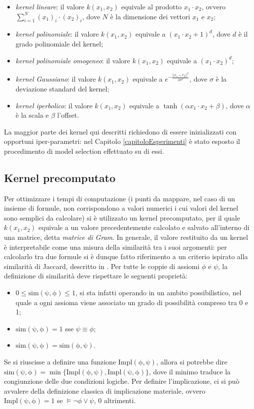 \documentclass[12pt,a4paper]{report}
\begin{document}
\begin{itemize}
\item \emph{kernel lineare}: il valore $k(x_1,x_2)$ equivale al prodotto $x_1\cdot x_2$, ovvero  $\sum_{i=1}^N(x_1)_i\cdot(x_2)_i$, dove $N$ è la dimensione dei vettori $x_1$ e $x_2$;
\item \emph{kernel polinomiale}: il valore $k(x_1,x_2)$ equivale a $(x_1\cdot x_2 + 1)^d$, dove $d$ è il grado polinomiale del kernel;
\item \emph{kernel polinomiale omogeneo}:  il valore  $k(x_1,x_2)$ equivale a $(x_1\cdot x_2)^d$;
\item \emph{kernel Gaussiano}:   il valore  $k(x_1,x_2)$ equivale a $e^{-\frac{||x_1 - x_2||^2}{2 \sigma^2}}$, dove $\sigma$ è la deviazione standard del kernel;
\item \emph{kernel iperbolico}:   il valore $k(x_1,x_2)$  equivale a $\tanh(\alpha x_1 \cdot x_2 + \beta)$, dove $\alpha$ è la scala e $\beta$ l'offset.
\end{itemize}

La maggior parte dei kernel qui descritti richiedono di essere inizializzati con opportuni iper-parametri: nel Capitolo \ref{capitoloEsperimenti} è stato esposto il procedimento di model selection effettuato su di essi.

\subsection{Kernel precomputato}
\label{jaccardSection}
Per ottimizzare i tempi di computazione (i punti da mappare, nel caso di un insieme di formule, non corrispondono a valori numerici i cui valori del kernel sono semplici da calcolare) si è utilizzato un kernel precomputato, per il quale  $k(x_1,x_2)$ equivale a un valore precedentemente calcolato e salvato all'interno di una matrice, detta \emph{matrice di Gram}.
In generale, il valore restituito da un kernel è interpretabile come una misura della similarità tra i suoi argomenti: per calcolarlo tra due formule si è dunque fatto riferimento a un criterio ispirato alla similarità di Jaccard, descritto in \cite{sacpaper}.
Per tutte le coppie di assiomi $\phi$ e $\psi$, la definizione di similarità deve rispettare le seguenti proprietà:
\begin{itemize}
\item $0 \leq \mathrm{sim(\psi, \phi)} \leq 1$, si sta infatti operando in un ambito possibilistico, nel quale a ogni assioma viene associato un grado di possibilità compreso tra 0 e 1;
\item $\mathrm{sim(\psi, \phi)} = 1$ sse $\psi \equiv \phi $;
\item $\mathrm{sim(\psi, \phi)} = \mathrm{sim(\phi,\psi)}$.
\end{itemize}
Se si riuscisse a definire una funzione $\mathrm{Impl(\phi,\psi)}$, allora si potrebbe dire $\mathrm{sim(\psi, \phi)} = \min \{\mathrm{Impl(\phi,\psi)}, \mathrm{Impl(\psi,\phi)}\}$, dove il minimo traduce la congiunzione delle due condizioni logiche.
Per definire l'implicazione, ci si può avvalere della definizione classica di implicazione materiale, ovvero $\mathrm{Impl(\psi,\phi)} = 1$ se $\models \lnot \phi \lor \psi$, 0 altrimenti.
\end{document}

